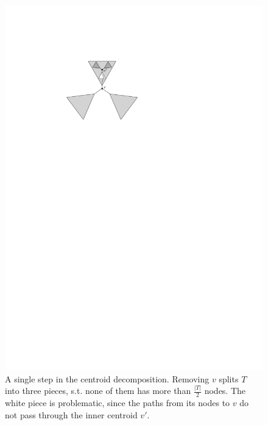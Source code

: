 \documentclass[a4paper,UKenglish]{lipics-v2016}
\theoremstyle{plain}
\begin{document}
\begin{figure}[ht]
\begin{center}
\includegraphics[scale=1]{centroid}
\end{center}
\caption{A single step in the centroid decomposition. Removing $v$ splits $T$ into three pieces, s.t. none of them has more than $\frac{|T|}{2}$ nodes. The white piece is problematic, since the paths from its nodes to $v$ do not pass through the inner centroid $v'$.}
\end{figure}

\centroidmatrix*
\end{document}
